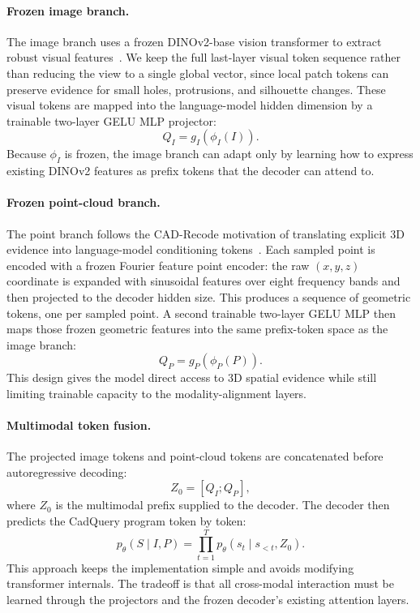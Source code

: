 \documentclass{article}
\begin{document}
\paragraph{Frozen image branch.}
The image branch uses a frozen DINOv2-base vision transformer to extract robust visual features~\cite{oquab2023dinov2}. We keep the full last-layer visual token sequence rather than reducing the view to a single global vector, since local patch tokens can preserve evidence for small holes, protrusions, and silhouette changes. These visual tokens are mapped into the language-model hidden dimension by a trainable two-layer GELU MLP projector:
\begin{equation}
Q_I = g_I(\phi_I(I)).
\end{equation}
Because $\phi_I$ is frozen, the image branch can adapt only by learning how to express existing DINOv2 features as prefix tokens that the decoder can attend to.

\paragraph{Frozen point-cloud branch.}
The point branch follows the CAD-Recode motivation of translating explicit 3D evidence into language-model conditioning tokens~\cite{cadrecode}. Each sampled point is encoded with a frozen Fourier feature point encoder: the raw $(x,y,z)$ coordinate is expanded with sinusoidal features over eight frequency bands and then projected to the decoder hidden size. This produces a sequence of geometric tokens, one per sampled point. A second trainable two-layer GELU MLP then maps those frozen geometric features into the same prefix-token space as the image branch:
\begin{equation}
Q_P = g_P(\phi_P(P)).
\end{equation}
This design gives the model direct access to 3D spatial evidence while still limiting trainable capacity to the modality-alignment layers.

\paragraph{Multimodal token fusion.}
The projected image tokens and point-cloud tokens are concatenated before autoregressive decoding:
\begin{equation}
Z_0 = [Q_I; Q_P],
\end{equation}
where $Z_0$ is the multimodal prefix supplied to the decoder. The decoder then predicts the CadQuery program token by token:
\begin{equation}
p_{\theta}(S\mid I,P)=\prod_{t=1}^{T}p_{\theta}(s_t\mid s_{<t},Z_0).
\end{equation}
This approach keeps the implementation simple and avoids modifying transformer internals. The tradeoff is that all cross-modal interaction must be learned through the projectors and the frozen decoder's existing attention layers.
\end{document}
